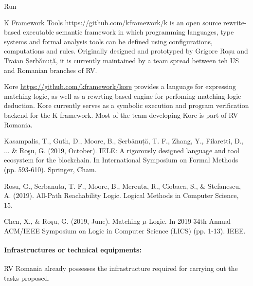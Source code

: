 \begin{sitedescription}{Run}
\begin{compactitem}
\item K Framework Tools \url{https://github.com/kframework/k} is an open source
 rewrite-based executable semantic framework in which programming languages,
 type systems and formal analysis tools can be defined using configurations,
 computations and rules. Originally designed and prototyped by Grigore Roșu and 
 Traian Șerbănuță, it is currently maintained by a team spread between teh US and 
 Romanian branches of RV. 
\item Kore \url{https://github.com/kframework/kore} provides a language for
expressing matching logic, as well as a rewrting-based engine for perfoming 
matching-logic deduction.  Kore currently serves as a symbolic execution and 
program verification backend for the K framework. Most of the team developing Kore
is part of RV Romania.
\item Kasampalis, T., Guth, D., Moore, B., Șerbănuță, T. F., Zhang, Y., Filaretti, D., ... \& Roşu, G. (2019, October). IELE: A rigorously designed language and tool ecosystem for the blockchain. In International Symposium on Formal Methods (pp. 593-610). Springer, Cham.
\item Rosu, G., Serbanuta, T. F., Moore, B., Mereuta, R., Ciobaca, S., \& Stefanescu, A. (2019). All-Path Reachability Logic. Logical Methods in Computer Science, 15.
\item Chen, X., \& Roşu, G. (2019, June). Matching $\mu$-Logic. In 2019 34th Annual ACM/IEEE Symposium on Logic in Computer Science (LICS) (pp. 1-13). IEEE.
\end{compactitem}




\paragraph*{Infrastructures or technical equipments:}

RV Romania already possesses the infrastructure required for carrying out the tasks proposed.


\end{sitedescription}
